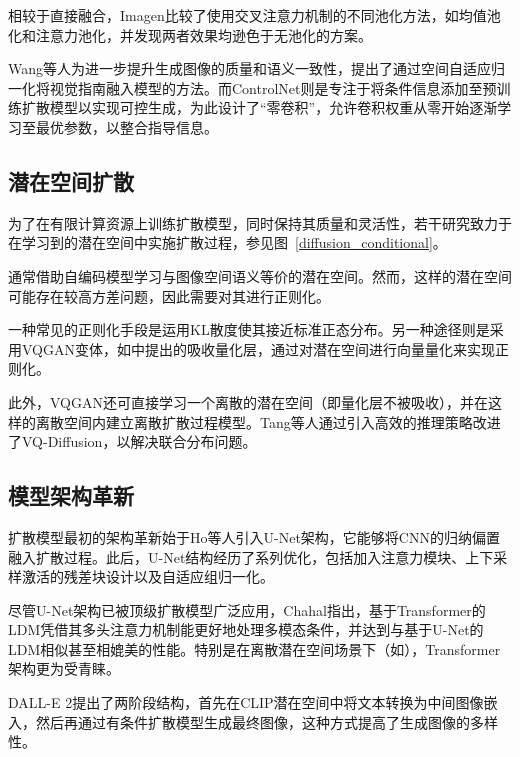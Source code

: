 相较于直接融合，Imagen\cite{saharia2022photorealistic}比较了使用交叉注意力机制的不同池化方法，如均值池化和注意力池化，并发现两者效果均逊色于无池化的方案。

Wang等人\cite{wang2022semantic}为进一步提升生成图像的质量和语义一致性，提出了通过空间自适应归一化将视觉指南融入模型的方法。而ControlNet\cite{zhang2023adding}则是专注于将条件信息添加至预训练扩散模型以实现可控生成，为此设计了“零卷积”，允许卷积权重从零开始逐渐学习至最优参数，以整合指导信息。

\subsection{潜在空间扩散}
\label{latent_diffusion}

为了在有限计算资源上训练扩散模型，同时保持其质量和灵活性，若干研究致力于在学习到的潜在空间中实施扩散过程，参见图~\ref{diffusion_conditional}。

通常借助自编码模型学习与图像空间语义等价的潜在空间。然而，这样的潜在空间可能存在较高方差问题，因此需要对其进行正则化。

一种常见的正则化手段是运用KL散度使其接近标准正态分布。另一种途径则是采用VQGAN\cite{esser2020taming}变体，如\cite{rombach2022high}中提出的吸收量化层，通过对潜在空间进行向量量化来实现正则化。

此外，VQGAN还可直接学习一个离散的潜在空间（即量化层不被吸收），并在这样的离散空间内建立离散扩散过程模型\cite{gu2021vector}。Tang等人\cite{tang2022improved}通过引入高效的推理策略改进了VQ-Diffusion，以解决联合分布问题。

\subsection{模型架构革新}
\label{model_architectures}

扩散模型最初的架构革新始于Ho等人\cite{ho2020denoising}引入U-Net架构，它能够将CNN的归纳偏置融入扩散过程。此后，U-Net结构经历了系列优化，包括加入注意力模块\cite{dhariwal2021diffusion}、上下采样激活的残差块设计\cite{song2020score}以及自适应组归一化\cite{dhariwal2021diffusion}。

尽管U-Net架构已被顶级扩散模型广泛应用，Chahal\cite{chahal2022exploring}指出，基于Transformer的LDM\cite{rombach2022high}凭借其多头注意力机制能更好地处理多模态条件，并达到与基于U-Net的LDM相似甚至相媲美的性能。特别是在离散潜在空间场景下（如\cite{jiang2022text2human, gu2021vector}），Transformer架构更为受青睐。

DALL-E 2\cite{ramesh2022hierarchical}提出了两阶段结构，首先在CLIP潜在空间中将文本转换为中间图像嵌入，然后再通过有条件扩散模型生成最终图像，这种方式提高了生成图像的多样性\cite{ramesh2022hierarchical}。

